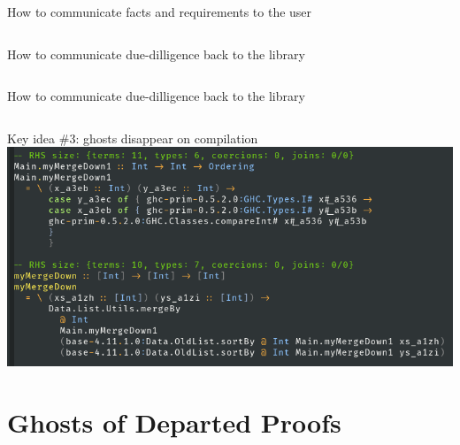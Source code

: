 \documentclass{beamer}
\begin{document}
\begin{frame}{How to communicate facts and requirements to the user}
\inputminted{haskell}{mergeghost2.hs}  
\end{frame}

\begin{frame}{How to communicate due-dilligence back to the library}
  \inputminted{haskell}{median.hs}  
\end{frame}

\begin{frame}{How to communicate due-dilligence back to the library}
  \inputminted{haskell}{mergeghost3.hs}  
\end{frame}

\begin{frame}{Key idea \#3: ghosts disappear on compilation}
  \includegraphics[width=0.8\paperwidth]{simpl}
\end{frame}

  \section{Ghosts of Departed Proofs}   %
\end{document}
